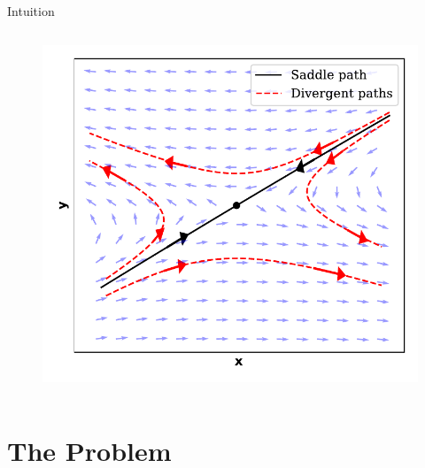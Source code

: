 \documentclass[aspectratio=169,10pt]{beamer}
\begin{document}
\begin{frame}{Intuition}
\begin{columns}
\begin{column}{0.5\textwidth}
\begin{figure}[t!]
			\includegraphics[width=\textwidth]{figs/saddle_path.pdf}
			\vspace{-7mm}
		\end{figure}
		\end{column}
	\end{columns}
\end{frame}

\section{The Problem}
\end{document}
